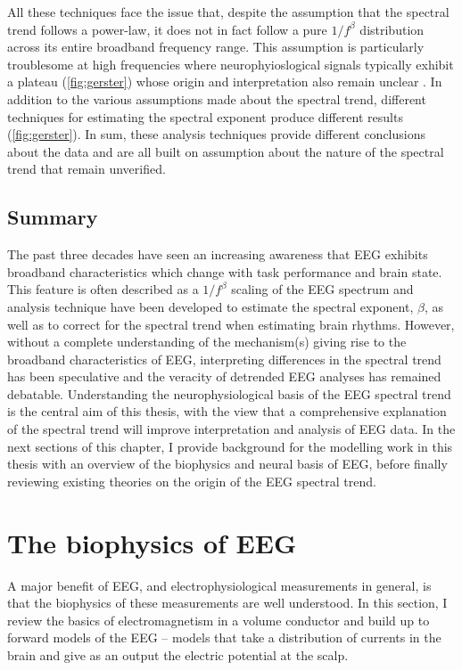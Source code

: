 All these techniques face the issue that, despite the assumption that the spectral trend follows a power-law, it does not in fact follow a pure $1/f^\beta$ distribution across its entire broadband frequency range. This assumption is particularly troublesome at high frequencies where neurophyioslogical signals typically exhibit a plateau  (\autoref{fig:gerster}) whose origin and interpretation also remain unclear \cite{Gerster2022}. In addition to the various assumptions made about the spectral trend, different techniques for estimating the spectral exponent produce different results (\autoref{fig:gerster}). In sum, these analysis techniques provide different conclusions about the data and are all built on assumption about the nature of the spectral trend that remain unverified. 

\subsection{Summary}
The past three decades have seen an increasing awareness that EEG exhibits broadband characteristics which change with task performance and brain state. This feature is often described as a $1/f^\beta$ scaling of the EEG spectrum and analysis technique have been developed to estimate the spectral exponent, $\beta$, as well as to correct for the spectral trend when estimating brain rhythms. However, without a complete understanding of the mechanism(s) giving rise to the broadband characteristics of EEG, interpreting differences in the spectral trend has been speculative and the veracity of detrended EEG analyses has remained debatable. Understanding the neurophysiological basis of the EEG spectral trend is the central aim of this thesis, with the view that a comprehensive explanation of the spectral trend will improve interpretation and analysis of EEG data. In the next sections of this chapter, I provide background for the modelling work in this thesis with an overview of the biophysics and neural basis of EEG, before finally reviewing existing theories on the origin of the EEG spectral trend.

\section{The biophysics of EEG} \label{sec:EM_theory}

A major benefit of EEG, and electrophysiological measurements in general, is that the biophysics of these measurements are well understood. In this section, I review the basics of electromagnetism in a volume conductor and build up to forward models of the EEG -- models that take a distribution of currents in the brain and give as an output the electric potential at the scalp.

